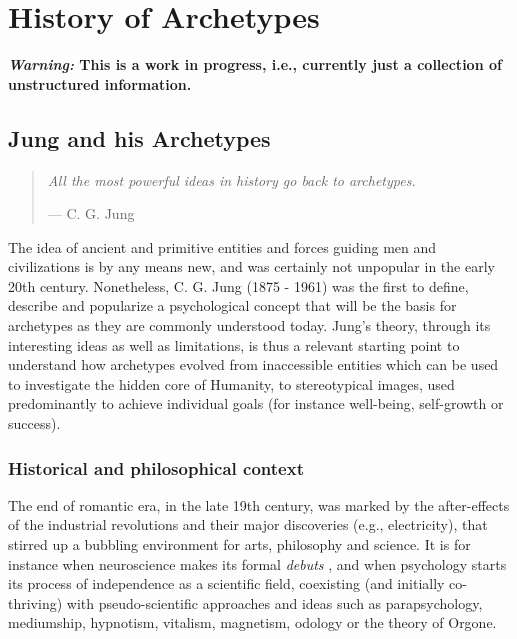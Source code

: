 \documentclass[
]{book}
\begin{document}
\hypertarget{history-of-archetypes}{%
\chapter{History of Archetypes}\label{history-of-archetypes}}

\textbf{\emph{Warning:} This is a work in progress, i.e., currently just a collection of unstructured information.}

\hypertarget{jung-and-his-archetypes}{%
\section{Jung and his Archetypes}\label{jung-and-his-archetypes}}

\begin{quote}
\emph{All the most powerful ideas in history go back to archetypes.}

\hfill --- C. G. Jung
\end{quote}

The idea of ancient and primitive entities and forces guiding men and civilizations is by any means new, and was certainly not unpopular in the early 20th century. Nonetheless, C. G. Jung (1875 - 1961) was the first to define, describe and popularize a psychological concept that will be the basis for archetypes as they are commonly understood today.
Jung's theory, through its interesting ideas as well as limitations, is thus a relevant starting point to understand how archetypes evolved from inaccessible entities which can be used to investigate the hidden core of Humanity, to stereotypical images, used predominantly to achieve individual goals (for instance well-being, self-growth or success).

\hypertarget{historical-and-philosophical-context}{%
\subsection{Historical and philosophical context}\label{historical-and-philosophical-context}}

The end of romantic era, in the late 19th century, was marked by the after-effects of the industrial revolutions and their major discoveries (e.g., electricity), that stirred up a bubbling environment for arts, philosophy and science. It is for instance when neuroscience makes its formal \emph{debuts} \citep[even though the term ``neuroscience'' would appear only a century later, in the 1960s;][]{rose20155o}, and when psychology starts its process of independence as a scientific field, coexisting (and initially co-thriving) with pseudo-scientific approaches and ideas such as parapsychology, mediumship, hypnotism, vitalism, magnetism, odology or the theory of Orgone.
\end{document}
